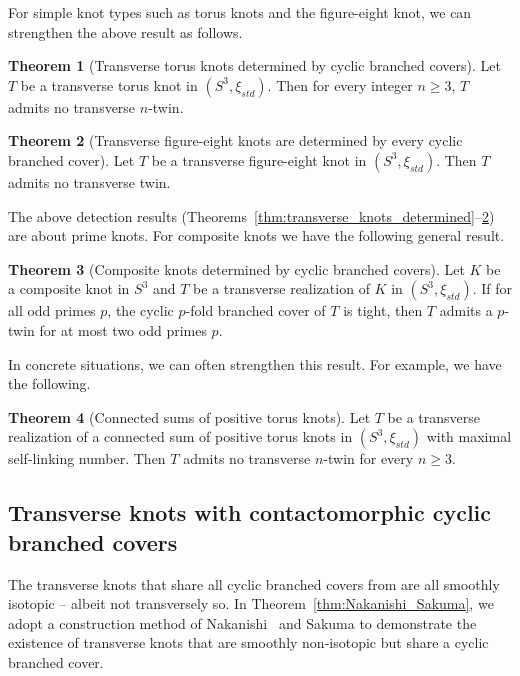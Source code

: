 \documentclass[11pt]{amsart}
\theoremstyle{definition}
\theoremstyle{definition}
\theoremstyle{definition}
\theoremstyle{definition}
\newtheorem{theorem}{Theorem}[section]
\begin{document}
For simple knot types such as torus knots and the figure-eight knot, we can strengthen the above result as follows.
\begin{theorem}[Transverse torus knots determined by cyclic branched covers]\label{thm:torus}
    Let $T$ be a transverse torus knot in $(S^3,\xi_{std})$. 
    Then for every integer $n\geq3$, $T$ admits no transverse $n$-twin.
\end{theorem}

\begin{theorem}[Transverse figure-eight knots are determined by every cyclic branched cover]\label{thm:fig_8}
    Let $T$ be a transverse figure-eight knot in $(S^3,\xi_{std})$. Then $T$ admits no transverse twin.
\end{theorem}

The above detection results (Theorems~\ref{thm:transverse_knots_determined}--\ref{thm:fig_8}) are about prime knots. For composite knots we have the following general result.

\begin{theorem}[Composite knots determined by cyclic branched covers] \label{thm:composite}
    Let $K$ be a composite knot in $S^3$ and $T$ be a transverse realization of $K$ in $(S^3,\xi_{std})$. If for all odd primes $p$, the cyclic $p$-fold branched cover of $T$ is tight, 
    then $T$ admits a $p$-twin for at most two odd primes $p$.
\end{theorem}

In concrete situations, we can often strengthen this result. For example, we have the following.

\begin{theorem}[Connected sums of positive torus knots]\label{thm:fig_8_sum}
    Let $T$ be a transverse realization of a connected sum of positive torus knots in $(S^3,\xi_{std})$ with maximal self-linking number. Then $T$ admits no transverse $n$-twin for every $n\geq3$.
\end{theorem}

\subsection{Transverse knots with contactomorphic cyclic branched covers}

The transverse knots that share all cyclic branched covers from \cite{Harvey_br_covers} are all smoothly isotopic -- albeit not transversely so. In Theorem~\ref{thm:Nakanishi_Sakuma}, we adopt a construction method of Nakanishi~\cite{nakanishi} and Sakuma \cite{sakuma} to demonstrate the existence of transverse knots that are smoothly non-isotopic but  share a cyclic branched cover.
\end{document}
